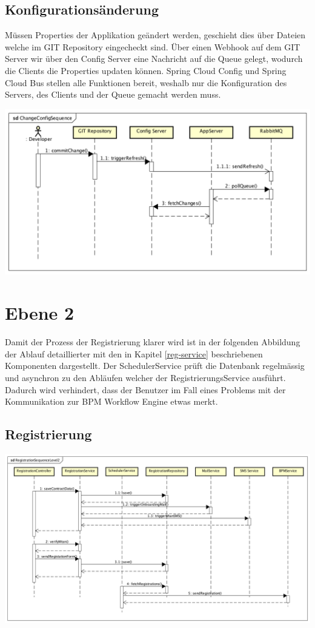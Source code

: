 \subsection{Konfigurationsänderung}

Müssen Properties der Applikation geändert werden, geschieht dies über Dateien  welche im GIT Repository eingecheckt sind. Über einen Webhook auf dem GIT Server wir über den Config Server eine Nachricht auf die Queue gelegt, wodurch die Clients die Properties updaten können. Spring Cloud Config und Spring Cloud Bus stellen alle Funktionen bereit, weshalb nur die Konfiguration des Servers, des Clients und der Queue gemacht werden muss.
\begin{center}
	\includegraphics[scale=0.6]{ChangeConfigSequence.png}
\end{center}
\newpage
\section{Ebene 2}

Damit der Prozess der Registrierung klarer wird ist in der folgenden Abbildung der Ablauf detaillierter mit den in Kapitel \ref{reg-service} beschriebenen Komponenten dargestellt. Der SchedulerService prüft die Datenbank regelmässig und asynchron zu den Abläufen welcher der RegistrierungsService ausführt. Dadurch wird verhindert, dass der Benutzer im Fall eines Problems mit der Kommunikation zur BPM Workflow Engine etwas merkt.
\subsection{Registrierung}
\begin{center}
	\includegraphics[scale=0.42]{RegistrationSequenceLevel2.png}
\end{center}




